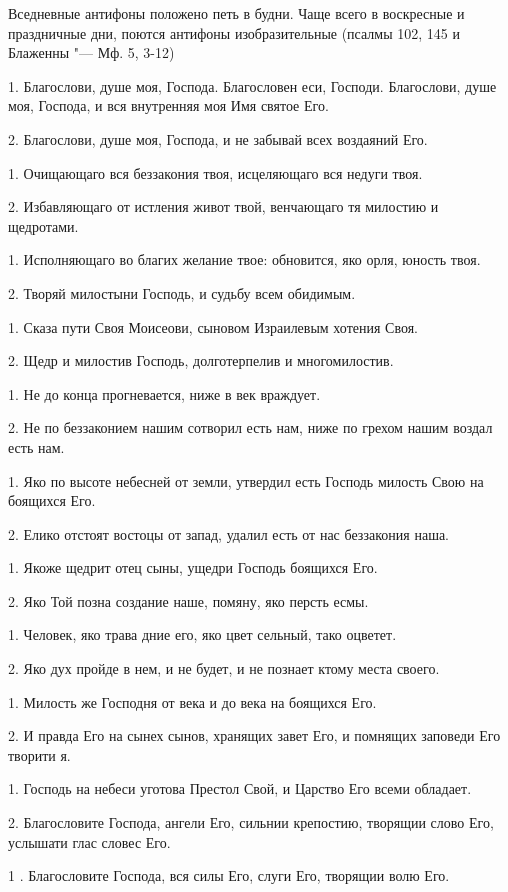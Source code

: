 Вседневные антифоны положено петь в будни. Чаще всего в воскресные и праздничные дни, поются антифоны изобразительные (псалмы 102, 145 и Блаженны "--- Мф. 5, 3-12)




1. Благослови, душе моя, Господа. Благословен еси, Господи. Благослови, душе моя, Господа, и вся внутренняя моя Имя святое Его. 


2. Благослови, душе моя, Господа, и не забывай всех воздаяний Его. 


1. Очищающаго вся беззакония твоя,  исцеляющаго вся недуги твоя. 


2. Избавляющаго от истления живот твой,  венчающаго тя милостию и щедротами. 


1. Исполняющаго во благих желание твое:  обновится, яко орля, юность твоя. 


2. Творяй милостыни Господь, и судьбу всем обидимым. 


1. Сказа пути Своя Моисеови, сыновом Израилевым хотения Своя. 


2. Щедр и милостив Господь, долготерпелив и многомилостив.


1. Не до конца прогневается, ниже в век враждует. 


2. Не по беззаконием нашим сотворил есть нам, ниже по грехом нашим воздал есть нам. 


1. Яко по высоте небесней от земли,  утвердил есть Господь милость Свою на боящихся Его. 


2. Елико отстоят востоцы от запад,  удалил есть от нас беззакония наша. 


1. Якоже щедрит отец сыны, ущедри Господь боящихся Его. 


2. Яко Той позна создание наше, помяну, яко персть есмы. 


1. Человек, яко трава дние его, яко цвет сельный, тако оцветет. 


2. Яко дух пройде в нем, и не будет, и не познает ктому места своего. 


1. Милость же Господня от века и до века на боящихся Его. 


2. И правда Его на сынех сынов, хранящих завет Его, и помнящих заповеди Его творити я. 


1. Господь на небеси уготова Престол Свой, и Царство Его всеми обладает. 


2. Благословите Господа, ангели Его,  сильнии крепостию, творящии слово Его, услышати глас словес Его. 


1 . Благословите Господа, вся силы Его, слуги Его, творящии волю Его. 


